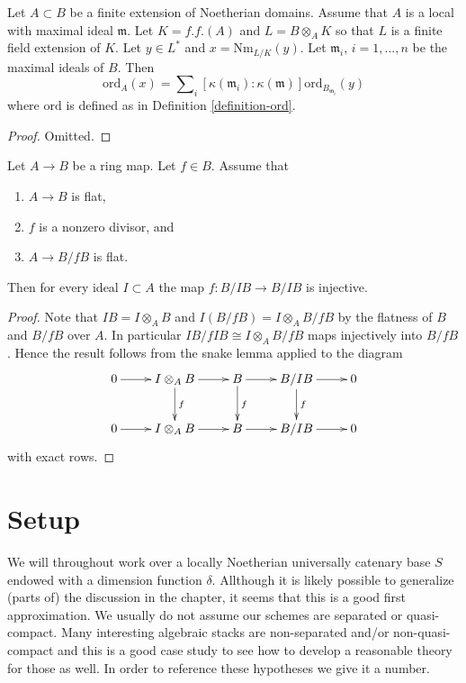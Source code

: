 \begin{lemma}
\label{lemma-finite-extension-dim-1}
Let $A \subset B$ be a finite extension of Noetherian domains.
Assume that $A$ is a local with maximal ideal $\mathfrak m$.
Let $K = f.f.(A)$ and $L = B \otimes_A K$ so that $L$ is
a finite field extension of $K$.
Let $y \in L^*$ and $x = \text{Nm}_{L/K}(y)$.
Let $\mathfrak m_i$, $i = 1, \ldots, n$ be the maximal ideals of $B$.
Then
$$
\text{ord}_A(x) =
\sum\nolimits_i
[\kappa(\mathfrak m_i) : \kappa(\mathfrak m)]
\text{ord}_{B_{\mathfrak m_i}}(y)
$$
where $\text{ord}$ is defined as in Definition \ref{definition-ord}.
\end{lemma}

\begin{proof}
Omitted.
\end{proof}

\begin{lemma}
\label{lemma-relative-effective-cartier-algebra}
Let $A \to B$ be a ring map. Let $f \in B$. Assume that
\begin{enumerate}
\item $A \to B$ is flat,
\item $f$ is a nonzero divisor, and
\item $A \to B/fB$ is flat.
\end{enumerate}
Then for every ideal $I \subset A$ the map
$f : B/IB \to B/IB$ is injective.
\end{lemma}

\begin{proof}
Note that $IB = I \otimes_A B$ and $I(B/fB) = I\otimes_A B/fB$
by the flatness of $B$ and $B/fB$ over $A$.
In particular $IB/fIB \cong I \otimes_A B/fB$ maps injectively
into $B/fB$. Hence the result follows from the snake lemma applied
to the diagram
$$
\xymatrix{
0 \ar[r] &
I \otimes_A B \ar[r] \ar[d]^f &
B \ar[r] \ar[d]^f &
B/IB \ar[r] \ar[d]^f &
0 \\
0 \ar[r] &
I \otimes_A B \ar[r] &
B \ar[r] &
B/IB \ar[r] &
0
}
$$
with exact rows.
\end{proof}








\section{Setup}
\label{section-setup}

\noindent
We will throughout work over a locally Noetherian universally
catenary base $S$ endowed with a dimension function $\delta$.
Allthough it is likely possible to generalize (parts of) the
discussion in the chapter, it seems that this is a good first
approximation. We usually do not assume our schemes are
separated or quasi-compact. Many interesting algebraic stacks
are non-separated and/or non-quasi-compact and this is a good
case study to see how to develop a reasonable theory for those as well.
In order to reference these hypotheses we give it a number.

